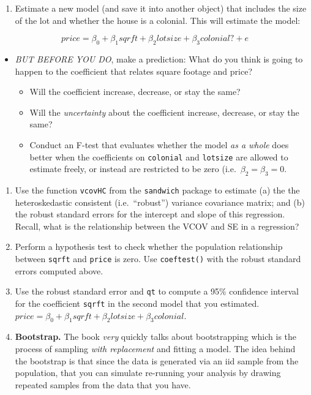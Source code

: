 \documentclass[
]{book}
\providecommand{\tightlist}{%
  \setlength{\itemsep}{0pt}\setlength{\parskip}{0pt}}
\theoremstyle{definition}
\theoremstyle{definition}
\theoremstyle{definition}
\theoremstyle{definition}
\theoremstyle{remark}
\begin{document}
\begin{enumerate}
\def\labelenumi{\arabic{enumi}.}
\tightlist
\item
  Estimate a new model (and save it into another object) that includes the size of the lot and whether the house is a colonial. This will estimate the model:
\end{enumerate}

\[
  price = \beta_{0} + \beta_{1} sqrft + \beta_{2} lotsize + \beta_{3} colonial? + e
\]

\begin{itemize}
\tightlist
\item
  \emph{BUT BEFORE YOU DO}, make a prediction: What do you think is going to happen to the coefficient that relates square footage and price?

  \begin{itemize}
  \tightlist
  \item
    Will the coefficient increase, decrease, or stay the same?
  \item
    Will the \emph{uncertainty} about the coefficient increase, decrease, or stay the same?
  \item
    Conduct an F-test that evaluates whether the model \emph{as a whole} does better when the coefficients on \texttt{colonial} and \texttt{lotsize} are allowed to estimate freely, or instead are restricted to be zero (i.e.~\(\beta_{2} = \beta_{3} = 0\).
  \end{itemize}
\end{itemize}

\begin{enumerate}
\def\labelenumi{\arabic{enumi}.}
\setcounter{enumi}{1}
\item
  Use the function \texttt{vcovHC} from the \texttt{sandwich} package to estimate (a) the the heteroskedastic consistent (i.e.~``robust'') variance covariance matrix; and (b) the robust standard errors for the intercept and slope of this regression. Recall, what is the relationship between the VCOV and SE in a regression?
\item
  Perform a hypothesis test to check whether the population relationship between \texttt{sqrft} and \texttt{price} is zero. Use \texttt{coeftest()} with the robust standard errors computed above.
\item
  Use the robust standard error and \texttt{qt} to compute a 95\% confidence interval for the coefficient \texttt{sqrft} in the second model that you estimated. \(price = \beta_{0} + \beta_{1} sqrft + \beta_{2} lotsize + \beta_{3} colonial\).
\item
  \textbf{Bootstrap.} The book \emph{very} quickly talks about bootstrapping which is the process of sampling \emph{with replacement} and fitting a model. The idea behind the bootstrap is that since the data is generated via an iid sample from the population, that you can simulate re-running your analysis by drawing repeated samples from the data that you have.
\end{enumerate}
\end{document}
